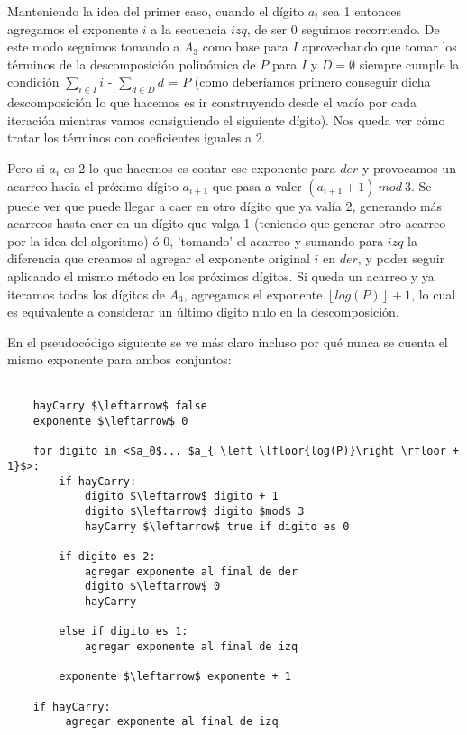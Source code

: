 	Manteniendo la idea del primer caso, cuando el dígito $a_i$ sea 1 entonces agregamos el exponente $i$ a la secuencia $izq$, de ser 0 seguimos recorriendo. De este modo seguimos tomando a $A_3$ como base para $I$ aprovechando que tomar los términos de la descomposición polinómica de $P$ para $I$ y $D = \emptyset$ siempre cumple la condición $\sum_{i \in I} i$ - $\sum_{d \in D} d$ = $P$ (como deberíamos primero conseguir dicha descomposición lo que hacemos es ir construyendo desde el vacío por cada iteración mientras vamos consiguiendo el siguiente dígito). Nos queda ver cómo tratar los términos con coeficientes iguales a 2.

	Pero si $a_i$ es 2 lo que hacemos es contar ese exponente para $der$ y provocamos un acarreo hacia el próximo dígito $a_{i+1}$ que pasa a valer $(a_{i+1} + 1) \ mod \ 3$. Se puede ver que puede llegar a caer en otro dígito que ya valía 2, generando más acarreos hasta caer en un dígito que valga 1 (teniendo que generar otro acarreo por la idea del algoritmo) ó 0, 'tomando' el acarreo y sumando para $izq$ la diferencia que creamos al agregar el exponente original $i$ en $der$, y poder seguir aplicando el mismo método en los próximos dígitos. Si queda un acarreo y ya iteramos todos los dígitos de $A_3$, agregamos el exponente $\left \lfloor{log(P)}\right \rfloor + 1$, lo cual es equivalente a considerar un último dígito nulo en la descomposición.

 	En el pseudocódigo siguiente se ve más claro incluso por qué nunca se cuenta el mismo exponente para ambos conjuntos:
\\
\\
\begin{lstlisting}
    hayCarry $\leftarrow$ false
    exponente $\leftarrow$ 0

    for digito in <$a_0$... $a_{ \left \lfloor{log(P)}\right \rfloor + 1}$>:
        if hayCarry:
            digito $\leftarrow$ digito + 1
            digito $\leftarrow$ digito $mod$ 3
            hayCarry $\leftarrow$ true if digito es 0

        if digito es 2:
            agregar exponente al final de der
            digito $\leftarrow$ 0
            hayCarry

        else if digito es 1:
            agregar exponente al final de izq

        exponente $\leftarrow$ exponente + 1

    if hayCarry:
         agregar exponente al final de izq

\end{lstlisting}

